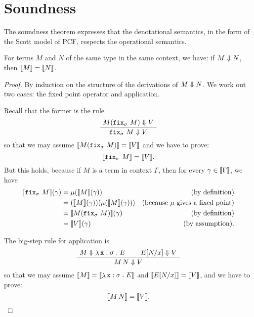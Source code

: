 \chapter{Soundness}\label{chap:soundness}

The soundness theorem expresses that the denotational semantics, in the form of
the Scott model of PCF, respects the operational semantics.

\begin{theorem}[Soundness]\label{soundness}
  For terms \(M\) and \(N\) of the same type in the same context, we have: if
  \(M \Downarrow N\), then \(\llbracket M\rrbracket = \llbracket N\rrbracket\).
\end{theorem}
\begin{proof}
  By induction on the structure of the derivations of \(M \Downarrow N\).
  We work out two cases: the fixed point operator and application.

  Recall that the former is the rule
  \[
    \AxiomC{\(M(\pcffix_{\sigma} \, M) \bigstep V\)}
    \UnaryInfC{\({\pcffix_{\sigma} \, M} \bigstep V\)}
    \DisplayProof
  \]
  so that we may assume \(\llbracket M(\operatorname{\mathtt{fix}}_\sigma\,M)\rrbracket = \llbracket V\rrbracket\) and we
  have to prove:
  \[
    \llbracket\operatorname{\mathtt{fix}}_{\sigma} \, M\rrbracket = \llbracket V\rrbracket.
  \]
  But this holds, because if \(M\) is a term in context \(\Gamma\), then for
  every \(\gamma \in \llbracket\Gamma\rrbracket\), we have
  \begin{align*}
    \densem{\pcffix_{\sigma} \,M}(\gamma)
    &= \mu\pa*{\densem{M}(\gamma)}
    &\text{(by definition)} \\
    &= \pa*{\densem{M}(\gamma)}\pa*{\mu\pa*{\densem{M}(\gamma)}}
    &\text{(because \(\mu\) gives a fixed point)} \\
    &= \densem{M\pa*{\pcffix_{\sigma}\,M}}(\gamma)
    &\text{(by definition)} \\
    &= \densem{V}(\gamma) &\text{(by assumption)}.
  \end{align*}

  The big-step rule for application is
  \[
    \AxiomC{\(M \bigstep \lambdadot{\var x : \sigma}{E}\)}
    \AxiomC{\(E[N/x] \bigstep V\)}
    \BinaryInfC{\(M \, N \bigstep V\)}
    \DisplayProof
  \]
  so that we may assume
  \(\llbracket M\rrbracket = \llbracket\mathop{\lambda}{\mathtt x : \sigma}\mathrel{.}E\rrbracket\)
  and
  \(\llbracket E[N/x]\rrbracket = \llbracket V\rrbracket\),
  and we have to prove:
  \[
    \llbracket M \, N\rrbracket = \llbracket V\rrbracket.
  \]
\end{proof}


